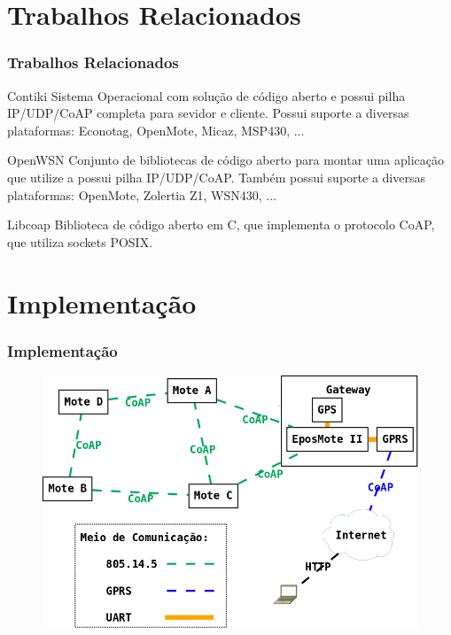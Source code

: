 \documentclass{beamer}
\begin{document}

\section{Trabalhos Relacionados}
\begin{frame}
\frametitle{Trabalhos Relacionados}
\begin{block}{Contiki}
Sistema Operacional com solução de código aberto e possui pilha IP/UDP/CoAP completa para sevidor e cliente.
Possui suporte a diversas plataformas: Econotag, OpenMote, Micaz, MSP430, ...
\end{block}

\begin{block}{OpenWSN}
Conjunto de bibliotecas de código aberto para montar uma aplicação que utilize a possui pilha IP/UDP/CoAP.
Também possui suporte a diversas plataformas: OpenMote, Zolertia Z1, WSN430, ...
\end{block}

\begin{block}{Libcoap}
Biblioteca de código aberto em C, que implementa o protocolo CoAP, que utiliza sockets POSIX.
\end{block}
\end{frame}


\section{Implementação}

\begin{frame}
\frametitle{Implementação}
\begin{figure}
\includegraphics[width=0.9\linewidth]{../figuras/arquiteturaSlide}
\end{figure}
\end{frame}
\end{document}
